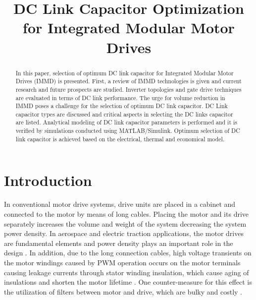 \documentclass[conference,a4paper,twocolumn]{IEEEtran}
\begin{document}
\title{DC Link Capacitor Optimization for Integrated Modular Motor Drives}
\author{
\and
{}
}
\maketitle


\begin{abstract}
In this paper, selection of optimum DC link capacitor for Integrated Modular Motor Drives (IMMD) is presented. First, a review of IMMD technologies is given and current research and future prospects are studied. Inverter topologies and gate drive techniques are evaluated in terms of DC link performance. The urge for volume reduction in IMMD poses a challenge for the selection of optimum DC link capacitor. DC Link capacitor types are discussed and critical aspects in selecting the DC links capacitor are listed. Analytical modeling of DC link capacitor parameters is performed and it is verified by simulations conducted using MATLAB/Simulink. Optimum selection of DC link capacitor is achieved based on the electrical, thermal and economical model.
\end{abstract}


\IEEEpeerreviewmaketitle





\section{Introduction}


In conventional motor drive systems, drive units are placed in a cabinet and connected to the motor by means of long cables. Placing the motor and its drive separately increases the volume and weight of the system decreasing the system power density. In aerospace and electric traction applications, the motor drives are fundamental elements and power density plays an important role in the design \cite{LoCalzo2016,Wolmarans2008,Hennen2012,Lambert2015a,Lambert2015b,Galassini2015}. In addition, due to the long connection cables, high voltage transients on the motor windings caused by PWM operation occurs on the motor terminals causing leakage currents through stator winding insulation, which cause aging of insulations and shorten the motor lifetime \cite{Wang2013,Jahns2014}. One counter-measure for this effect is the utilization of filters between motor and drive, which are bulky and costly \cite{LoCalzo2016}.
\end{document}
